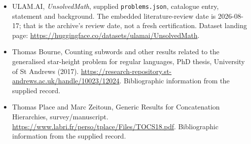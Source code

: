 \documentclass[11pt,a4paper]{article}
\begin{document}
{\small

\begin{itemize}

\item[\hypertarget{source:statement:1}{S1}] ULAM.AI, \emph{UnsolvedMath}, supplied \texttt{problems.json}, catalogue entry, statement and background. The embedded literature-review date is 2026-08-17; that is the archive’s review date, not a fresh certification. Dataset landing page: \url{https://huggingface.co/datasets/ulamai/UnsolvedMath}.

\item[\hypertarget{source:statement:2}{S2}] Thomas Bourne, Counting subwords and other results related to the generalised star-height problem for regular languages, PhD thesis, University of St Andrews (2017). \url{https://research-repository.st-andrews.ac.uk/handle/10023/12024}. Bibliographic information from the supplied record.

\item[\hypertarget{source:statement:3}{S3}] Thomas Place and Marc Zeitoun, Generic Results for Concatenation Hierarchies, survey/manuscript. \url{https://www.labri.fr/perso/tplace/Files/TOCS18.pdf}. Bibliographic information from the supplied record.

\end{itemize}

}

\label{end:statement}
\end{document}
